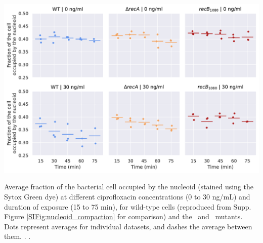 \begin{suppfigure*}[htbp]
    \begin{center}
    \includegraphics[width=.8\textwidth]{SI_Figures/Mutants_nucleoid_compaction.pdf}
    \end{center}
    \caption{Average fraction of the bacterial cell occupied by the nucleoid (stained using the Sytox Green dye) at different ciprofloxacin concentrations (0 to 30 ng/mL) and duration of exposure (15 to 75 min), for wild-type cells (reproduced from Supp. Figure \ref{SIFig:nucleoid_compaction} for comparison) and the \dreca\ and \geneteneighty\ mutants. Dots represent averages for individual datasets, and dashes the average between them. . .}
    \label{SIFig:mutants_nucleoid_compaction}
\end{suppfigure*}
